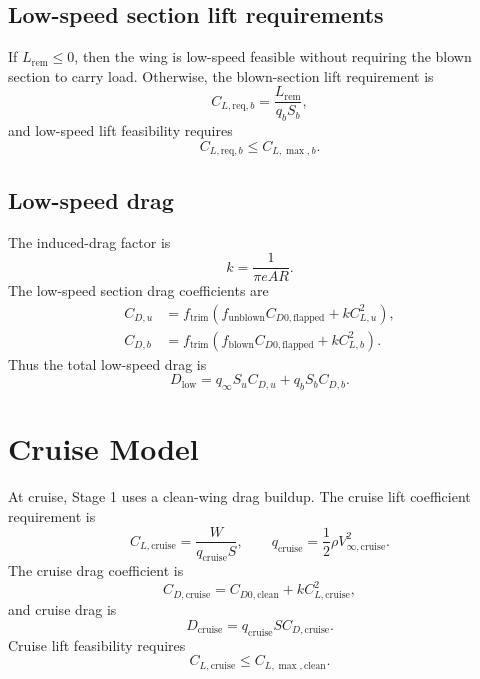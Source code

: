 \documentclass[11pt]{article}
\begin{document}
\subsection{Low-speed section lift requirements}

If \(L_{\mathrm{rem}} \le 0\), then the wing is low-speed feasible without requiring the blown section to carry load. Otherwise, the blown-section lift requirement is
\begin{equation}
C_{L,\mathrm{req},b} = \frac{L_{\mathrm{rem}}}{q_b S_b},
\end{equation}
and low-speed lift feasibility requires
\begin{equation}
C_{L,\mathrm{req},b} \le C_{L,\max,b}.
\end{equation}

\subsection{Low-speed drag}

The induced-drag factor is
\begin{equation}
k = \frac{1}{\pi e AR}.
\end{equation}
The low-speed section drag coefficients are
\begin{align}
C_{D,u} &= f_{\mathrm{trim}}
\left(
f_{\mathrm{unblown}} C_{D0,\mathrm{flapped}} + k C_{L,u}^2
\right), \\
C_{D,b} &= f_{\mathrm{trim}}
\left(
f_{\mathrm{blown}} C_{D0,\mathrm{flapped}} + k C_{L,b}^2
\right).
\end{align}
Thus the total low-speed drag is
\begin{equation}
D_{\mathrm{low}} = q_\infty S_u C_{D,u} + q_b S_b C_{D,b}.
\end{equation}

\section{Cruise Model}

At cruise, Stage 1 uses a clean-wing drag buildup. The cruise lift coefficient requirement is
\begin{equation}
C_{L,\mathrm{cruise}} = \frac{W}{q_{\mathrm{cruise}} S},
\qquad
q_{\mathrm{cruise}} = \frac{1}{2}\rho V_{\infty,\mathrm{cruise}}^2.
\end{equation}
The cruise drag coefficient is
\begin{equation}
C_{D,\mathrm{cruise}} = C_{D0,\mathrm{clean}} + k C_{L,\mathrm{cruise}}^2,
\end{equation}
and cruise drag is
\begin{equation}
D_{\mathrm{cruise}} = q_{\mathrm{cruise}} S C_{D,\mathrm{cruise}}.
\end{equation}
Cruise lift feasibility requires
\begin{equation}
C_{L,\mathrm{cruise}} \le C_{L,\max,\mathrm{clean}}.
\end{equation}
\end{document}
